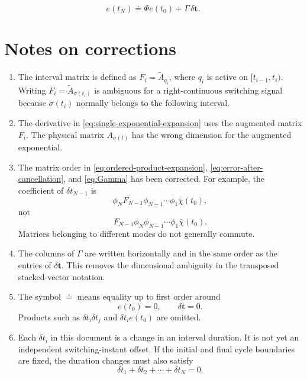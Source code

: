 \documentclass[12pt]{article}
\begin{document}
\begin{equation}
\boxed{
    e(t_N)\doteq\Phi e(t_0)+\Gamma\,\delta\boldsymbol t
    }.
    \label{eq:final-linearization}
\end{equation}

\section*{Notes on corrections}

\begin{enumerate}
    \item The interval matrix is defined as
    $F_i=\widetilde A_{q_i}$, where $q_i$ is active on
    $[t_{i-1},t_i)$.  Writing $F_i=\widetilde A_{\sigma(t_i)}$ is ambiguous
    for a right-continuous switching signal because $\sigma(t_i)$ normally
    belongs to the following interval.

    \item The derivative in \eqref{eq:single-exponential-expansion} uses the
    augmented matrix $F_i$.  The physical matrix $A_{\sigma(t)}$ has the
    wrong dimension for the augmented exponential.

    \item The matrix order in \eqref{eq:ordered-product-expansion},
    \eqref{eq:error-after-cancellation}, and \eqref{eq:Gamma} has been
    corrected.  For example, the coefficient of $\delta t_{N-1}$ is
    \begin{equation*}
        \phi_NF_{N-1}\phi_{N-1}\cdots\phi_1\bar\chi(t_0),
    \end{equation*}
    not
    \begin{equation*}
        F_{N-1}\phi_N\phi_{N-1}\cdots\phi_1\bar\chi(t_0).
    \end{equation*}
    Matrices belonging to different modes do not generally commute.

    \item The columns of $\Gamma$ are written horizontally and in the same
    order as the entries of $\delta\boldsymbol t$.  This removes the
    dimensional ambiguity in the transposed stacked-vector notation.

    \item The symbol $\doteq$ means equality up to first order around
    \begin{equation*}
        e(t_0)=0,
        \qquad
        \delta\boldsymbol t=0.
    \end{equation*}
    Products such as $\delta t_i\delta t_j$ and
    $\delta t_i e(t_0)$ are omitted.

    \item Each $\delta t_i$ in this document is a change in an interval
    duration.  It is not yet an independent switching-instant offset.  If
    the initial and final cycle boundaries are fixed, the duration changes
    must also satisfy
    \begin{equation*}
        \delta t_1+\delta t_2+\cdots+\delta t_N=0.
    \end{equation*}
\end{enumerate}
\end{document}
